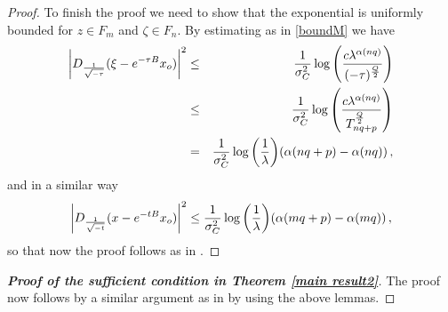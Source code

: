 \documentclass{amsart}
\numberwithin{equation}{section}
\begin{document}
{\begin{proof}
To finish the proof we need to show that the exponential is uniformly bounded for $z\in F_m$ and $\zeta\in F_n$. By estimating as in \eqref{boundM} we have
\begin{eqnarray*}
\left|D_{\frac{1}{\sqrt{-\tau}}}(\xi-e^{-\tau B}x_{\rm o})\right|^2 & \leq & \frac{1}{\sigma^2_C }\log{\left(\frac{c\lambda^{\alpha(nq)}}{(-\tau)^{\frac{Q}{2}}}\right)}\\
&\leq& \frac{1}{\sigma^2_C }\log{\left(\frac{c\lambda^{\alpha(nq)}}{T_{nq+p}^{\frac{Q}{2}}}\right)}\notag\\
& = & \frac{1}{\sigma^2_C }\log{\left(\frac{1}{\lambda}\right)}(\alpha(nq+p)-\alpha(nq))\,,
\end{eqnarray*}
and in a similar way
\[
\left|D_{\frac{1}{\sqrt{-t}}}(x-e^{-tB}x_{\rm o})\right|^2 \leq  \frac{1}{\sigma^2_C }\log{\left(\frac{1}{\lambda}\right)}(\alpha(mq+p)-\alpha(mq))\,,
\]
so that now the proof follows as in \cite[Lemma 6.3]{KLT18}.
\end{proof}


\begin{proof}[\bf Proof of the sufficient condition in Theorem \ref{main result2}] 
The proof now follows by a similar argument as in \cite[Theorem 1.1]{KLT18} by using the above lemmas.
\end{proof}

}
\end{document}
